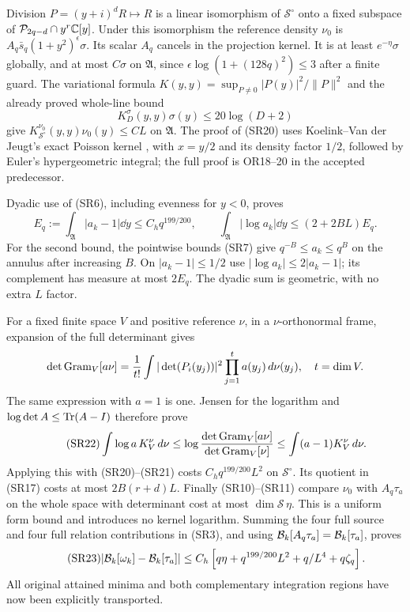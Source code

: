 \documentclass[11pt,a4paper]{article}
\begin{document}
Division $P=(y+i)^dR\mapsto R$ is a linear isomorphism of $\mathcal S^\circ$
onto a fixed subspace of $\mathcal P_{2q-d}\cap y^r\mathbb C[y]$. Under this isomorphism
the reference density $\nu_0$ is
$A_q\bar s_q(1+y^2)^\epsilon\sigma$. Its scalar $A_q$ cancels in the
projection kernel. It is at least $e^{-\eta}\sigma$ globally, and at most
$C\sigma$ on $\mathfrak A$, since
$\epsilon\log(1+(128q)^2)\le3$ after a finite guard.
The variational formula $K(y,y)=\sup_{P\ne0}|P(y)|^2/\|P\|^2$ and the
already proved whole-line bound
\begin{equation}\tag{SR20}
 K_D^\sigma(y,y)\sigma(y)\le20\log(D+2)
\end{equation}
give $K_{\mathcal S^\circ}^{\nu_0}(y,y)\nu_0(y)\le C L$ on $\mathfrak A$.
The proof of (SR20) uses Koelink--Van der Jeugt's exact Poisson kernel
\cite{a02sr:KVJ}, with $x=y/2$ and its density factor $1/2$, followed by Euler's
hypergeometric integral; the full proof is OR18--20 in the accepted predecessor.

Dyadic use of (SR6), including evenness for $y<0$, proves
\begin{equation}\tag{SR21}
 E_q:=\int_{\mathfrak A}|a_k-1|\dd y\le C_hq^{199/200},\qquad
 \int_{\mathfrak A}|\log a_k|\dd y\le(2+2BL)E_q.
\end{equation}
For the second bound, the pointwise bounds (SR7) give
$q^{-B}\le a_k\le q^B$ on the annulus after increasing $B$.
On $|a_k-1|\le1/2$ use $|\log a_k|\le2|a_k-1|$; its complement has
measure at most $2E_q$. The dyadic sum is geometric, with no extra $L$ factor.

For a fixed finite space $V$ and positive reference $\nu$, in a
$\nu$-orthonormal frame, expansion of the full determinant gives
\[
 \det\operatorname{Gram}_V[a\nu]=\frac1{t!}\int
 |\det(P_i(y_j))|^2\prod_{j=1}^ta(y_j)\,d\nu(y_j),\quad t=\dim V.
\]
The same expression with $a=1$ is one. Jensen for the logarithm and
$\log\det A\le\operatorname{Tr}(A-I)$ therefore prove
\begin{equation}\tag{SR22}
 \int\log a\,K_V^\nu\,d\nu
 \le\log\frac{\det\operatorname{Gram}_V[a\nu]}{\det\operatorname{Gram}_V[\nu]}
 \le\int(a-1)K_V^\nu\,d\nu.
\end{equation}
Applying this with (SR20)--(SR21) costs $C_hq^{199/200}L^2$ on
$\mathcal S^\circ$. Its quotient in (SR17) costs at most $2B(r+d)L$.
Finally (SR10)--(SR11) compare $\nu_0$ with $A_q\tau_a$ on the whole space
with determinant cost at most $\dim\mathcal S\,\eta$. This is a uniform
form bound and introduces no kernel logarithm.
Summing the four full source and four full relation contributions in (SR3),
and using $\mathcal B_k[A_q\tau_a]=\mathcal B_k[\tau_a]$, proves
\begin{equation}\tag{SR23}
 |\mathcal B_k[\omega_k]-\mathcal B_k[\tau_a]|
 \le C_h\left[q\eta+q^{199/200}L^2+q/L^4+q\zeta_q\right].
\end{equation}
All original attained minima and both complementary integration regions have
now been explicitly transported.
\end{document}

